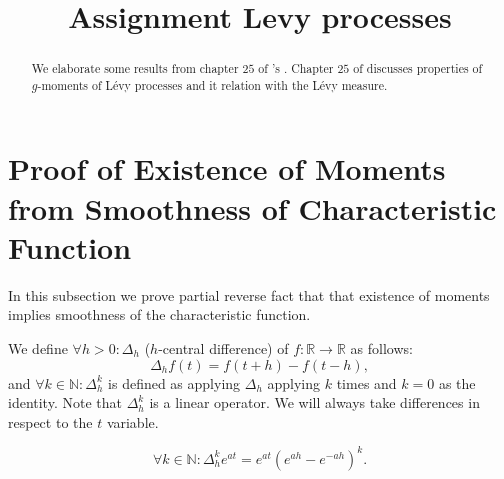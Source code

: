 \documentclass[a4paper,11pt]{article}
\title{Assignment Levy processes}
\author{}
\date{}
\begin{document}
\maketitle

\begin{abstract}
    We elaborate some results from chapter $25$ of \citeauthor{sato_levy_2013}'s  \cite{sato_levy_2013}. Chapter $25$ of \cite{sato_levy_2013} discusses properties of $g$-moments of Lévy processes and it relation with the Lévy measure.
\end{abstract}

\section{Proof of Existence of Moments from Smoothness of Characteristic Function}

In this subsection we prove partial reverse fact that that existence of moments implies smoothness of the characteristic function. 

\begin{definition}[$\Delta^{k}_{h}$]
    We define $\forall h>0: \Delta_{h}$ ($h$-central difference) of $f:\mathbb{R}\rightarrow \mathbb{R}$ as follows:
    \begin{equation}
        \Delta_{h} f(t) = f(t+h)- f(t-h),
    \end{equation}
    and $\forall k \in \mathbb{N}:\Delta^{k}_{h}$ is defined as applying $\Delta_{h}$ applying $k$ times and
    $k=0$ as the identity. Note that $\Delta^{k}_{h}$ is a linear operator. We will always take
    differences in respect to the $t$ variable.
\end{definition}

\begin{lemma}[$\Delta^{k}_{h} e^{at}$]
    \begin{equation}
        \forall k \in \mathbb{N}: \Delta^{k}_{h} e^{at} =  e^{at} \left( e^{ah} - e^{-ah} \right)^{k}.
    \end{equation}
\end{lemma}
\end{document}
